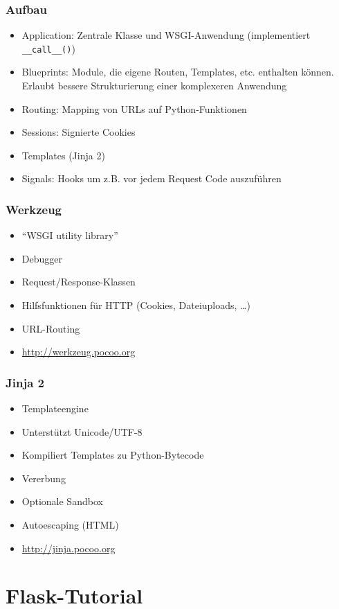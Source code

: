 \documentclass{beamer}
\begin{document}
\begin{frame}
  \frametitle{Aufbau}
  \begin{itemize}
    \item Application: Zentrale Klasse und WSGI-Anwendung (implementiert \lstinline{__call__()})
    \item Blueprints: Module, die eigene Routen, Templates, etc. enthalten können. Erlaubt bessere
          Strukturierung einer komplexeren Anwendung
    \item Routing: Mapping von URLs auf Python-Funktionen
    \item Sessions: Signierte Cookies
    \item Templates (Jinja 2)
    \item Signals: Hooks um z.B. vor jedem Request Code auszuführen
  \end{itemize}
\end{frame}

\begin{frame}
  \frametitle{Werkzeug}
  \begin{itemize}
    \item \enquote{WSGI utility library}
    \item Debugger
    \item Request/Response-Klassen
    \item Hilfsfunktionen für HTTP (Cookies, Dateiuploads, \ldots)
    \item URL-Routing
    \item \url{http://werkzeug.pocoo.org}
  \end{itemize}
\end{frame}

\begin{frame}
  \frametitle{Jinja 2}
  \begin{itemize}
    \item Templateengine
    \item Unterstützt Unicode/UTF-8
    \item Kompiliert Templates zu Python-Bytecode
    \item Vererbung
    \item Optionale Sandbox
    \item Autoescaping (HTML)
    \item \url{http://jinja.pocoo.org}
  \end{itemize}
\end{frame}

\section{Flask-Tutorial}
\end{document}
